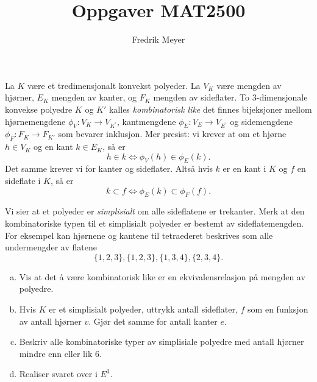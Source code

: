 \documentclass[11pt, norsk]{article}
\begin{document}
\title{Oppgaver MAT2500}
\author{Fredrik Meyer}
\maketitle 

\begin{oppg}
La $K$ være et tredimensjonalt konvekst polyeder. La $V_K$ være mengden av hjørner, $E_K$ mengden av kanter, og $F_K$ mengden av sideflater. To $3$-dimensjonale konvekse polyedre $K$ og $K'$ kalles \emph{kombinatorisk like} det finnes bijeksjoner mellom hjørnemengdene $\phi_V:V_K \to V_{K^\prime}$, kantmengdene $\phi_{E}:V_E \to V_{E^\prime}$ og sidemengdene $\phi_F:F_K \to F_{K'}$ som bevarer inklusjon. Mer presist: vi krever at om et hjørne $h \in V_K$ og en kant $k \in E_K$, så er 
\[
h \in k \Leftrightarrow \phi_V(h) \in \phi_E(k).
\]
Det samme krever vi for kanter og sideflater. Altså hvis $k$ er en kant i $K$ og $f$ en sideflate i $K$, så er
\[
k \subset f \Leftrightarrow \phi_E(k) \subset \phi_F(f).
\]

Vi sier at et polyeder er \emph{simplisialt} om alle sideflatene er trekanter. Merk at den kombinatoriske typen til et simplisialt polyeder er bestemt av sideflatemengden. For eksempel kan hjørnene og kantene til tetraederet beskrives som alle undermengder av flatene
\[
\{ 1,2,3 \}, \{ 1,2,3\}, \{ 1,3,4\}, \{ 2,3,4 \}.
\]
  \begin{enumerate}[a)]
  \item Vis at det å være kombinatorisk like er en ekvivalensrelasjon på mengden av polyedre.
  \item Hvis $K$ er et simplisialt polyeder, uttrykk antall sideflater, $f$ som en funksjon av antall hjørner $v$. Gjør det samme for antall kanter $e$.
\item Beskriv alle kombinatoriske typer av simplisiale polyedre med antall hjørner mindre enn eller lik $6$.
\item Realiser svaret over i $E^3$.
  \end{enumerate}
\end{oppg}
\end{document}

